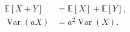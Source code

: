 \documentclass{article}
\begin{document}
\begin{align*}
  \mathbb E[X+Y] &= \mathbb E[X]+\mathbb E[Y],\\
  \operatorname{Var}(aX) &= a^2\operatorname{Var}(X).
\end{align*}
\end{document}
